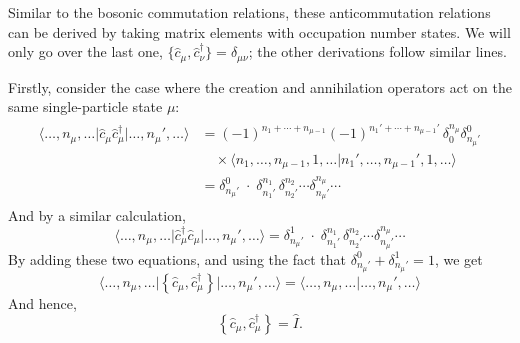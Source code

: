 \documentclass[pra,12pt]{revtex4}
\begin{document}
Similar to the bosonic commutation relations, these anticommutation
relations can be derived by taking matrix elements with occupation
number states.  We will only go over the last one,
$\big\{\hat{c}_\mu,\hat{c}_\nu^\dagger\big\} = \delta_{\mu\nu}$; the
other derivations follow similar lines.

Firstly, consider the case where the creation and annihilation
operators act on the same single-particle state $\mu$:
\begin{align}
  \begin{aligned}\big\langle \dots,n_\mu,\dots \big| \hat{c}_\mu \hat{c}_\mu^\dagger \big|\dots, n_\mu', \dots\big\rangle &= (-1)^{n_1+\cdots+n_{\mu-1}} (-1)^{n_1'+\cdots+n_{\mu-1}'} \,\delta^{n_\mu}_0 \delta^0_{n_\mu'} \\ &\quad\times \big\langle n_1,\dots,n_{\mu-1}, 1, \dots\big| n_1',\dots,n_{\mu-1}', 1, \dots \big\rangle \\ &= \delta^0_{n_\mu'} \; \cdot \; \delta^{n_1}_{n_1'} \, \delta^{n_2}_{n_2'} \cdots \delta^{n_\mu}_{n_\mu'} \cdots\end{aligned}
\end{align}
And by a similar calculation,
\begin{equation}
  \big\langle \dots,n_\mu,\dots \big| \hat{c}_\mu^\dagger \hat{c}_\mu \big|\dots, n_\mu', \dots\big\rangle = \delta^1_{n_\mu'} \; \cdot \; \delta^{n_1}_{n_1'} \, \delta^{n_2}_{n_2'} \cdots \delta^{n_\mu}_{n_\mu'} \cdots
\end{equation}
By adding these two equations, and using the fact that
$\delta^0_{n_\mu'} + \delta^1_{n_\mu'} = 1$, we get
\begin{equation}
  \big\langle \dots,n_\mu,\dots \big| \left\{ \hat{c}_\mu, \hat{c}_\mu^\dagger\right\} \big|\dots, n_\mu', \dots\big\rangle = \big\langle \dots,n_\mu,\dots \big|\dots, n_\mu', \dots\big\rangle
\end{equation}
And hence,
\begin{equation}
  \left\{ \hat{c}_\mu, \hat{c}_\mu^\dagger\right\} = \hat{I}.
\end{equation}
\end{document}
